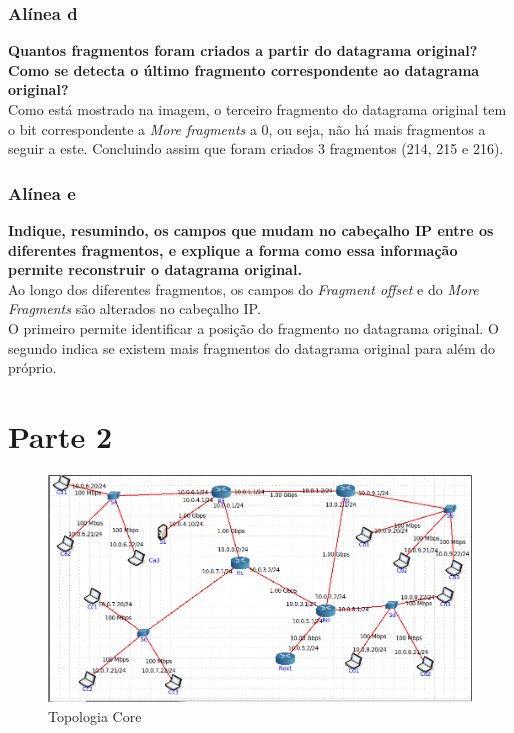 \documentclass[a4paper]{report}
\begin{document}
\subsection{Alínea d}
\textbf{Quantos fragmentos foram criados a partir do datagrama original?
Como se detecta o último fragmento correspondente ao datagrama original?}\\
Como está mostrado na imagem, o terceiro fragmento do datagrama original
tem o bit correspondente a \textit{More fragments} a 0, ou seja, não há mais 
fragmentos a seguir a este. Concluindo assim que foram criados 3 fragmentos 
(214, 215 e 216).

\subsection{Alínea e}
\textbf{Indique, resumindo, os campos que mudam no cabeçalho IP entre os
diferentes fragmentos, e explique a forma como essa informação permite
reconstruir o datagrama original.}\\
Ao longo dos diferentes fragmentos, os campos do \textit{Fragment offset} e do
\textit{More Fragments} são alterados no cabeçalho IP.\\
O primeiro permite identificar a posição do fragmento no datagrama original. O
segundo indica se existem mais fragmentos do datagrama original para além do
próprio.


\chapter{Parte 2}

\begin{figure}[H]
    \centering 
    \includegraphics[width=\textwidth]{images/topologiaCore.png}
    \caption{Topologia Core}
    \label{fig:topologiaCore}
\end{figure}
\end{document}
